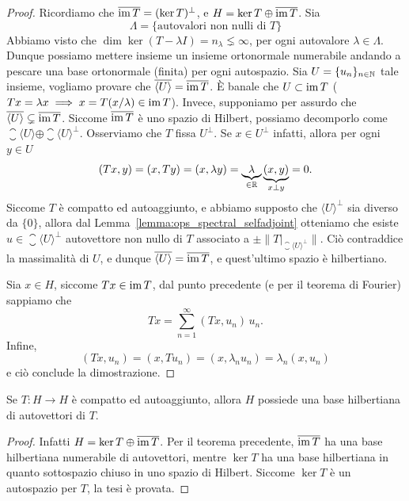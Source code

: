 \begin{proof}
	Ricordiamo che $\overline{\operatorname{im} T} = (\ker T)^\perp$, e $H= \ker T \oplus \overline{\operatorname{im} T}$. Sia
	\begin{equation*}
		\Lambda = \{ \text{autovalori non nulli di $T$} \}
	\end{equation*}
	Abbiamo visto che $\dim \ker (T -\lambda I) = n_\lambda \lneq \infty$, per ogni autovalore $\lambda \in \Lambda$. Dunque possiamo mettere insieme un insieme ortonormale numerabile andando a pescare una base ortonormale (finita) per ogni autospazio.
	Sia $U=\{u_n\}_{n \in \mathbb{N}}$ tale insieme, vogliamo provare che $\overline{\langle U \rangle} = \overline{\operatorname{im} T}$.
	È banale che $U \subset \operatorname{im} T$ ($Tx = \lambda x \implies x = T(x/\lambda) \in \operatorname{im} T$).
	Invece, supponiamo per assurdo che $\overline{\langle U \rangle } \subsetneq \overline{\operatorname{im} T}$. Siccome $\overline{\operatorname{im} T}$ è uno spazio di Hilbert, possiamo decomporlo come $\closure{\langle U \rangle} \oplus \closure{\langle U \rangle}^\perp$.
	Osserviamo che $T$ fissa $U^\perp$. Se $x \in U^\perp$ infatti, allora per ogni $y \in U$
	\begin{equation}
		(Tx,y) = (x,Ty) = (x, \lambda y) = \underbrace{\lambda}_{\in \mathbb{R}} \underbrace{(x,y)}_{x \perp y} = 0.
	\end{equation}
	Siccome $T$ è compatto ed autoaggiunto, e abbiamo supposto che $\langle U \rangle^\perp$ sia diverso da $\{0\}$, allora dal Lemma~\ref{lemma:ops_spectral_selfadjoint} otteniamo che esiste $u \in \closure{\langle U \rangle}^\perp$ autovettore non nullo di $T$ associato a $\pm \|T\vert_{\closure{\langle U \rangle}^\perp}\|$. Ciò contraddice la massimalità di $U$, e dunque $\overline{\langle U \rangle} = \overline{\operatorname{im} T}$, e quest'ultimo spazio è hilbertiano.

	Sia $x \in H$, siccome $Tx \in \operatorname{im} T$, dal punto precedente (e per il teorema di Fourier) sappiamo che
	\begin{equation*}
		Tx = \sum_{n=1}^\infty (Tx, u_n)\,u_n.
	\end{equation*}
	Infine,
	\begin{equation*}
		(Tx, u_n) = (x, Tu_n) = (x, \lambda_n u_n) = \lambda_n (x, u_n)
	\end{equation*}
	e ciò conclude la dimostrazione.
\end{proof}

\begin{corollary}
	Se $T:H \to H$ è compatto ed autoaggiunto, allora $H$ possiede una base hilbertiana di autovettori di $T$.
\end{corollary}
\begin{proof}
	Infatti $H = \ker T \oplus \overline{\operatorname{im} T}$. Per il teorema precedente, $\overline{\operatorname{im} T}$ ha una base hilbertiana numerabile di autovettori, mentre $\ker T$ ha una base hilbertiana in quanto sottospazio chiuso in uno spazio di Hilbert. Siccome $\ker T$ è un autospazio per $T$, la tesi è provata.
\end{proof}

